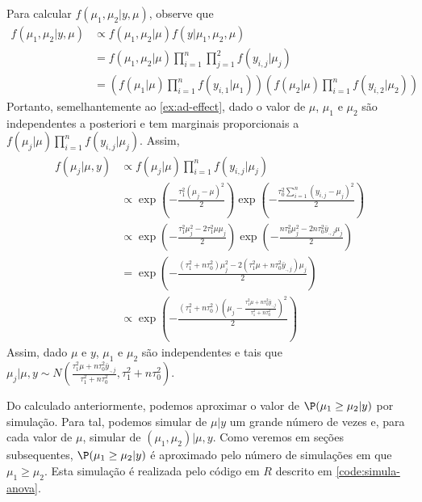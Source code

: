 { Para calcular $f(\mu_{1},\mu_{2}|y,\mu)$, 
 observe que
 \begin{align*}
  f(\mu_{1},\mu_{2}|y,\mu) &\propto
  f(\mu_{1},\mu_{2}|\mu)f(y|\mu_{1},\mu_{2},\mu) \\
  &= f(\mu_{1},\mu_{2}|\mu)\prod_{i=1}^{n}
  {\prod_{j=1}^{2}{f(y_{i,j}|\mu_{j})}}	\\
  &= \left(f(\mu_{1}|\mu)\prod_{i=1}^{n}{f(y_{i,1}|\mu_{1})}\right)\left(f(\mu_{2}|\mu)\prod_{i=1}^{n}{f(y_{i,2}|\mu_{2})}\right)
 \end{align*}
 Portanto, semelhantemente ao \cref{ex:ad-effect},
 dado o valor de $\mu$, $\mu_{1}$ e $\mu_{2}$ são
 independentes a posteriori e 
 tem marginais proporcionais a
 $f(\mu_{j}|\mu)\prod_{i=1}^{n}{f(y_{i,j}|\mu_{j})}$.
 Assim,
 \begin{align*}
  f(\mu_{j}|\mu,y) &\propto
  f(\mu_{j}|\mu)\prod_{i=1}^{n}{f(y_{i,j}|\mu_{j})} \\
  &\propto \exp\left(-\frac{\tau_{1}^{2}(\mu_{j}-\mu)^{2}}{2}\right)\exp\left(-\frac{\tau_{0}^{2}\sum_{i=1}^{n}(y_{i,j}-\mu_{j})^{2}}{2}\right)	\\
  &\propto \exp\left(-\frac{\tau_{1}^{2}\mu_{j}^{2}-2\tau_{1}^{2}\mu\mu_{j}}{2}\right)\exp\left(-\frac{n\tau_{0}^{2}\mu_{j}^{2}-2n\tau_{0}^{2}\bar{y}_{.,j}\mu_{j}}{2}\right) \\
  &= \exp\left(-\frac{(\tau_{1}^{2}+n\tau_{0}^{2})\mu_{j}^{2} -2(\tau_{1}^{2}\mu+n\tau_{0}^{2}\bar{y}_{.,j})\mu_{j}}{2}\right) \\
  &\propto \exp\left(-\frac{(\tau_{1}^{2}+n\tau_{0}^{2})\left(\mu_{j}-\frac{\tau_{1}^{2}\mu+n\tau_{0}^{2}\bar{y}_{.,j}}{\tau_{1}^{2}+n\tau_{0}^{2}}\right)^{2}}{2}\right)
 \end{align*}
 Assim, dado $\mu$ e $y$, 
 $\mu_{1}$ e $\mu_{2}$ são independentes e tais que
 $\mu_{j}|\mu,y \sim N\left(\frac{\tau_{1}^{2}\mu+n\tau_{0}^{2}\bar{y}_{.,j}}{\tau_{1}^{2}+n\tau_{0}^{2}}, \tau_{1}^{2}+n\tau_{0}^{2}\right)$.

 Do calculado anteriormente, 
 podemos aproximar o valor de 
 $\P(\mu_{1} \geq \mu_{2}|y)$ 
 por simulação.
 Para tal, podemos simular de $\mu|y$ um 
 grande número de vezes e,
 para cada valor de $\mu$,
 simular de $(\mu_{1},\mu_{2})|\mu,y$.
 Como veremos em seções subsequentes,
 $\P(\mu_{1} \geq \mu_{2}|y)$ é aproximado pelo
 número de simulações em que $\mu_{1} \geq \mu_{2}$.
 Esta simulação é realizada pelo código em $R$ descrito em 
 \cref{code:simula-anova}.

}
